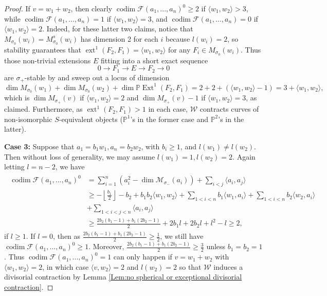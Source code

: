 \documentclass[leqno,11pt]{amsart}
\def\P{\ensuremath{\mathbb{P}}}
\def\codim{\mathop{\mathrm{codim}}\nolimits}
\def\dim{\mathop{\mathrm{dim}}\nolimits}
\def\Ext{\mathop{\mathrm{Ext}}\nolimits}
\def\ext{\mathop{\mathrm{ext}}\nolimits}
\theoremstyle{definition}
\def\P{\ensuremath{\mathbb{P}}}
\def\FF{\ensuremath{\mathcal F}}
\def\MM{\ensuremath{\mathcal M}}
\def\WW{\ensuremath{\mathcal W}}
\begin{document}
\begin{proof}
If $v=w_1+w_2$, then clearly $\codim\FF(a_1,...,a_n)^0\geq 2$ if $\langle w_1,w_2\rangle>3$, while  $\codim\FF(a_1,...,a_n)=1$ if $\langle w_1,w_2\rangle=3$, and $\codim\FF(a_1,...,a_n)=0$ if $\langle w_1,w_2\rangle=2$.  Indeed, for these latter two claims, notice that $M_{\sigma_0}(w_i)=M^s_{\sigma_0}(w_i)$ has dimension 2 for each $i$ because $l(w_i)=2$, so stability guarantees that $\ext^1(F_2,F_1)=\langle w_1,w_2\rangle$ for any $F_i\in M_{\sigma_0}(w_i)$.  Thus those non-trivial extensions $E$ fitting into a short exact sequence $$0\to F_1\to E\to F_2\to 0$$ are $\sigma_+$-stable by \cite[Lemma 6.9]{BM14b} and sweep out a locus of dimension $$\dim M_{\sigma_0}(w_1)+\dim M_{\sigma_0}(w_2)+\dim\P\Ext^1(F_2,F_1)=2+2+(\langle w_1,w_2\rangle-1)=3+\langle w_1,w_2\rangle,$$ which is $\dim M_{\sigma_+}(v)$ if $\langle w_1,w_2\rangle=2$ and $\dim M_{\sigma_+}(v)-1$ if $\langle w_1,w_2\rangle=3$, as claimed.  Furthermore, as $\ext^1(F_2,F_1)>1$ in each case, $\WW$ contracts curves of non-isomorphic $S$-equivalent objects ($\P^1$'s in the former case and $\P^2$'s in the latter).

\textbf{Case 3:} Suppose that $a_1=b_1w_1,a_n=b_2w_2$, with $b_i\geq 1$, and $l(w_1)\neq l(w_2)$.  Then without loss of generality, we may assume $l(w_1)=1,l(w_2)=2$.  Again letting $l=n-2$, we have \begin{align}\label{eq:case 3}
\begin{split}
\codim\FF(a_1,...,a_n)^0&=\sum_{i=1}^n(a_i^2-\dim\MM_{\sigma_-}(a_i))+\sum_{i<j}\langle a_i,a_j\rangle\\
&\geq-\left\lfloor\frac{b_1}{2}\right\rfloor-b_2+b_1 b_2\langle w_1,w_2\rangle+\sum_{1<i<n}b_1\langle w_1,a_i\rangle+\sum_{1<i<n}b_2\langle w_2,a_i\rangle\\
&+\sum_{1<i<j<n}\langle a_i,a_j\rangle\\
&\geq \frac{2b_2(b_1-1)+b_1(2b_2-1)}{2}+2b_1 l+2b_2 l+l^2-l\geq 2,
\end{split}
\end{align}
if $l\geq 1$. If $l=0$, then as $\frac{2b_2(b_1-1)+b_1(2b_2-1)}{2}\geq\frac{1}{2}$, we still have $\codim\FF(a_1,...,a_n)^0\geq 1$.  Moreover, $\frac{2b_2(b_1-1)+b_1(2b_2-1)}{2}\geq\frac{3}{2}$ unless $b_1=b_2=1$.  Thus $\codim\FF(a_1,...,a_n)^0=1$ can only happen if $v=w_1+w_2$ with $\langle w_1,w_2\rangle=2$, in which case $\langle v,w_2\rangle=2$ and $l(w_2)=2$ so that $\WW$ induces a divisorial contraction by Lemma \ref{Lem:no spherical or exceptional divisorial contraction}.


\end{proof}
\end{document}

